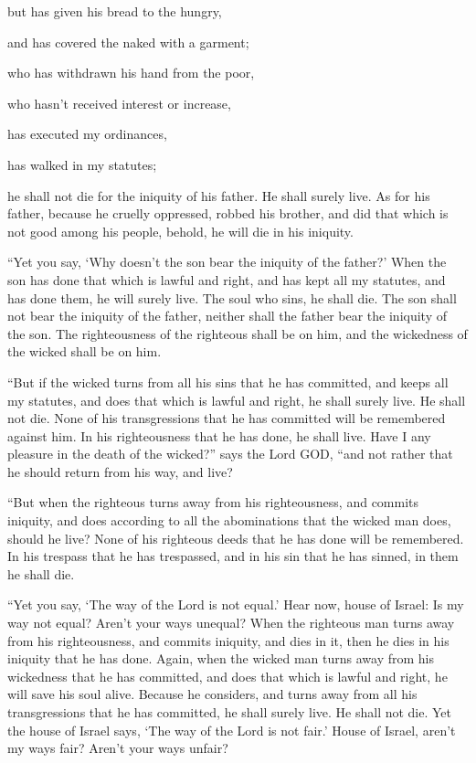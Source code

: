 but has given his bread to the hungry,

and has covered the naked with a garment;

\myverse{}who has withdrawn his hand from the poor,

who hasn’t received interest or increase,

has executed my ordinances,

has walked in my statutes;

he shall not die for the iniquity of his father. He shall surely live.
\myverse{}As for his father, because he cruelly oppressed, robbed his brother, and
did that which is not good among his people, behold, he will die in his iniquity.

\myverse{}“Yet you say, ‘Why doesn’t the son bear the iniquity of the
father?’ When the son has done that which is lawful and right, and has kept all my statutes, and has done
them, he will surely live.
\myverse{}The soul who sins, he shall die. The son shall not bear the iniquity of the
father, neither shall the father bear the iniquity of the son. The righteousness of the righteous shall
be on him, and the wickedness of the wicked shall be on him.

\myverse{}“But if the wicked turns from all his sins that he has committed,
and keeps all my statutes, and does that which is lawful and right, he shall surely live. He shall not
die.
\myverse{}None of his transgressions that he has committed will be remembered against
him. In his righteousness that he has done, he shall live.
\myverse{}Have I any pleasure in the death of the wicked?” says the Lord GOD, “and
not rather that he should return from his way, and live?

\myverse{}“But when the righteous turns away from his righteousness, and
commits iniquity, and does according to all the abominations that the wicked man does, should he live?
None of his righteous deeds that he has done will be remembered. In his trespass that he has trespassed,
and in his sin that he has sinned, in them he shall die.

\myverse{}“Yet you say, ‘The way of the Lord is not equal.’ Hear now,
house of Israel: Is my way not equal? Aren’t your ways unequal?
\myverse{}When the righteous man turns away from his righteousness, and commits iniquity,
and dies in it, then he dies in his iniquity that he has done.
\myverse{}Again, when the wicked man turns away from his wickedness that he has committed,
and does that which is lawful and right, he will save his soul alive.
\myverse{}Because he considers, and turns away from all his transgressions that he
has committed, he shall surely live. He shall not die.
\myverse{}Yet the house of Israel says, ‘The way of the Lord is not fair.’ House of
Israel, aren’t my ways fair? Aren’t your ways unfair?

